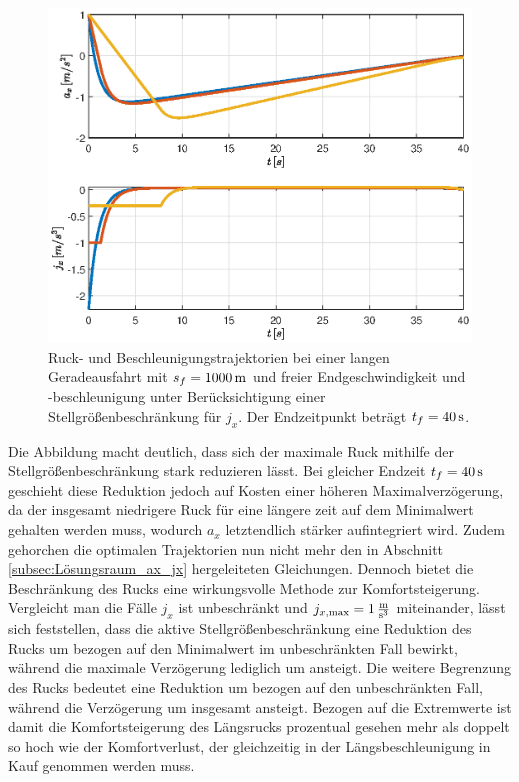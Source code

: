 \begin{figure}[h] 
	\centering
	\includegraphics[width=0.8\linewidth]{./Bilder/Ergebnisse/Geradeausfahrt/vf_af_frei_stellgroessenbeschr_ax_und_jx.eps}
	\caption{Ruck- und Beschleunigungstrajektorien bei einer langen Geradeausfahrt mit $s_f=1000\,\mathrm{m}$ und freier Endgeschwindigkeit und -beschleunigung unter Berücksichtigung einer Stellgrößenbeschränkung für $j_x$. Der Endzeitpunkt beträgt $t_f = 40\,\mathrm{s}$.}
	\label{fig:vf_af_frei_stellgroessenbeschr}
\end{figure} 
Die Abbildung macht deutlich, dass sich der maximale Ruck mithilfe der Stellgrößenbeschränkung stark reduzieren lässt. Bei gleicher Endzeit $t_f = 40\,\mathrm{s}$ geschieht diese Reduktion jedoch auf Kosten einer höheren Maximalverzögerung, da der insgesamt niedrigere Ruck für eine längere zeit auf dem Minimalwert gehalten werden muss, wodurch $a_x$ letztendlich stärker aufintegriert wird. Zudem gehorchen die optimalen Trajektorien nun nicht mehr den in Abschnitt \ref{subsec:Lösungsraum_ax_jx} hergeleiteten Gleichungen. Dennoch bietet die Beschränkung des Rucks eine wirkungsvolle Methode zur Komfortsteigerung. Vergleicht man die Fälle $j_x$ ist unbeschränkt und $j_{x,\textrm{max}} = 1\,\mathrm{\frac{\mathrm{m}}{\mathrm{s^3}}}$ miteinander, lässt sich feststellen, dass die aktive Stellgrößenbeschränkung eine Reduktion des Rucks um  bezogen auf den Minimalwert im unbeschränkten Fall bewirkt, während die maximale Verzögerung lediglich um  ansteigt. Die weitere Begrenzung des Rucks bedeutet eine Reduktion um  bezogen auf den unbeschränkten Fall, während die Verzögerung um insgesamt  ansteigt. Bezogen auf die Extremwerte ist damit die Komfortsteigerung des Längsrucks prozentual gesehen mehr als doppelt so hoch wie der Komfortverlust, der gleichzeitig in der Längsbeschleunigung in Kauf genommen werden muss. 

